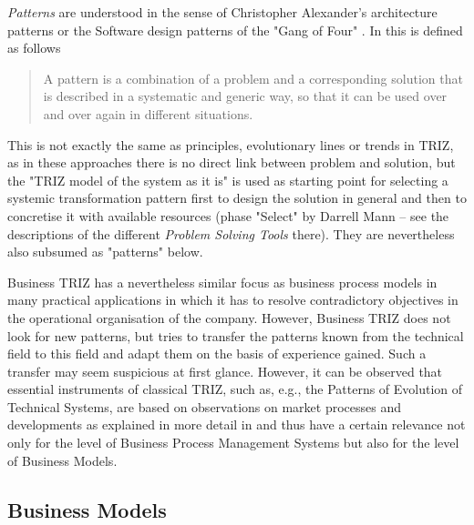 \documentclass[11pt,a4paper]{article}
\begin{document}
\emph{Patterns} are understood in the sense of Christopher Alexander's
architecture patterns \cite{Alexander} or the Software design patterns of the
"Gang of Four" \cite{Gamma}.  In \cite[p. 3]{LF2018} this is defined as
follows
\begin{quote}
  A pattern is a combination of a problem and a corresponding solution that is
  described in a systematic and generic way, so that it can be used over and
  over again in different situations.
\end{quote}

This is not exactly the same as principles, evolutionary lines or trends in
TRIZ, as in these approaches there is no direct link between problem and
solution, but the "TRIZ model of the system as it is" is used as starting
point for selecting a systemic transformation pattern first to design the
solution in general and then to concretise it with available resources (phase
"Select" by Darrell Mann \cite{Mann} -- see the descriptions of the different
\emph{Problem Solving Tools} there).  They are nevertheless also subsumed as
"patterns" below. 

Business TRIZ has a nevertheless similar focus as business process models in
many practical applications in which it has to resolve contradictory
objectives in the operational organisation of the company. However, Business
TRIZ does not look for new patterns, but tries to transfer the patterns known
from the technical field to this field and adapt them on the basis of
experience gained. Such a transfer may seem suspicious at first glance.
However, it can be observed that essential instruments of classical TRIZ, such
as, e.g., the Patterns of Evolution of Technical Systems, are based on
observations on market processes and developments as explained in more detail
in \cite{Graebe2020} and thus have a certain relevance not only for the level
of Business Process Management Systems but also for the level of Business
Models.

\subsection{Business Models}
\end{document}

